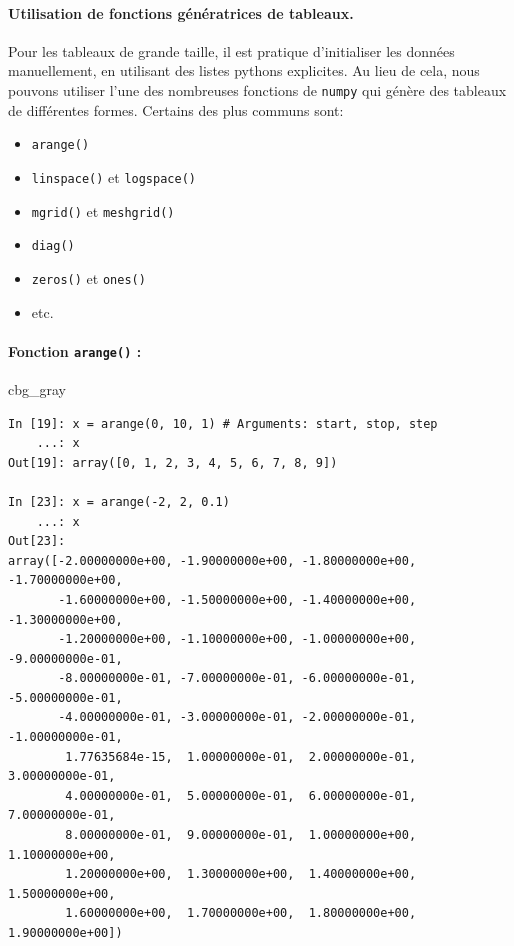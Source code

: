 \documentclass[%
oneside,                 %
final,                   %
10pt,french]{article}
\newenvironment{_cod_tight}[1]{
   \def\FrameCommand{\colorbox{#1}}
   \FrameRule0.6pt\MakeFramed {\FrameRestore}\vskip3mm}
   {\vskip0mm\endMakeFramed}
\newenvironment{cod}[1]{
\bgroup\rmfamily
\fboxsep=0mm\relax
\begin{_cod_tight}{#1}
\list{}{\parsep=-2mm\parskip=0mm\topsep=0pt\leftmargin=2mm
\rightmargin=2\leftmargin\leftmargin=4pt\relax}
\item\relax}
{\endlist\end{_cod_tight}\egroup}
\begin{document}
\paragraph{Utilisation de fonctions génératrices de tableaux.}
Pour les tableaux de grande taille, il est pratique d'initialiser les données manuellement, en utilisant des listes pythons explicites. Au lieu de cela, nous pouvons utiliser l’une des nombreuses fonctions de \texttt{numpy} qui génère des tableaux de différentes formes.
Certains des plus communs sont:

\begin{itemize}
\item \texttt{arange()}

\item \texttt{linspace()} et \texttt{logspace()}

\item \texttt{mgrid()} et \texttt{meshgrid()}

\item \texttt{diag()}

\item \texttt{zeros()} et \texttt{ones()}

\item etc.
\end{itemize}

\noindent
\paragraph{Fonction \texttt{arange()} :}

\begin{cod}{cbg_gray}\begin{verbatim}
In [19]: x = arange(0, 10, 1) # Arguments: start, stop, step
    ...: x
Out[19]: array([0, 1, 2, 3, 4, 5, 6, 7, 8, 9])

In [23]: x = arange(-2, 2, 0.1)
    ...: x
Out[23]:
array([-2.00000000e+00, -1.90000000e+00, -1.80000000e+00, -1.70000000e+00,
       -1.60000000e+00, -1.50000000e+00, -1.40000000e+00, -1.30000000e+00,
       -1.20000000e+00, -1.10000000e+00, -1.00000000e+00, -9.00000000e-01,
       -8.00000000e-01, -7.00000000e-01, -6.00000000e-01, -5.00000000e-01,
       -4.00000000e-01, -3.00000000e-01, -2.00000000e-01, -1.00000000e-01,
        1.77635684e-15,  1.00000000e-01,  2.00000000e-01,  3.00000000e-01,
        4.00000000e-01,  5.00000000e-01,  6.00000000e-01,  7.00000000e-01,
        8.00000000e-01,  9.00000000e-01,  1.00000000e+00,  1.10000000e+00,
        1.20000000e+00,  1.30000000e+00,  1.40000000e+00,  1.50000000e+00,
        1.60000000e+00,  1.70000000e+00,  1.80000000e+00,  1.90000000e+00])
\end{verbatim}
\end{cod}
\noindent
\end{document}
